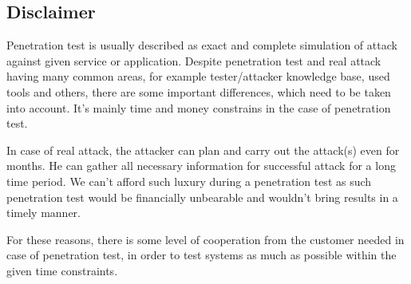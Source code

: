 \subsection{Disclaimer}
Penetration test is usually described as exact and complete simulation of attack against given service or application. Despite penetration test and real attack having many common areas, for example tester/attacker knowledge base, used tools and others, there are some important differences, which need to be taken into account. It's mainly time and money constrains in the case of penetration test.

In case of real attack, the attacker can plan and carry out the attack(s) even for months. He can gather all necessary information for successful attack for a long time period. We can't afford such luxury during a penetration test as such penetration test would be financially unbearable and wouldn't bring results in a timely manner.

For these reasons, there is some level of cooperation from the customer needed in case of penetration test, in order to test systems as much as possible within the given time constraints.
